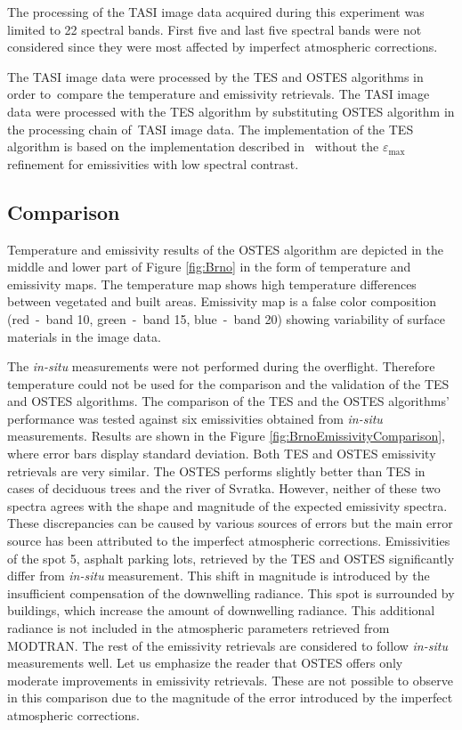 The processing of the TASI image data acquired during this experiment was limited to 22 spectral bands. First five and last five spectral bands were not considered since they were most affected by imperfect atmospheric corrections.

The TASI image data were processed by the TES and OSTES algorithms in order to~compare the temperature and emissivity retrievals. The TASI image data were processed with the TES algorithm by substituting OSTES algorithm in the processing chain of~TASI image data. The implementation of the TES algorithm is based on the implementation described in~\cite{JS12} without the $\varepsilon_\mathrm{max}$ refinement for emissivities with low spectral contrast.
 
\subsection*{Comparison}

Temperature and emissivity results of the OSTES algorithm are depicted in the middle and lower part of Figure \ref{fig:Brno} in the form of temperature and emissivity maps. The temperature map shows high temperature differences between vegetated and built areas. Emissivity map is a false color composition (red~-~band 10, green~-~band 15, blue~-~band 20) showing variability of surface materials in the image data.

\newpage
The \textit{in-situ} measurements were not performed during the overflight. Therefore temperature could not be used for the comparison and the validation of the TES and OSTES algorithms. The comparison of the TES and the OSTES algorithms' performance was tested against six emissivities obtained from \textit{in-situ} measurements. Results are shown in the Figure \ref{fig:BrnoEmissivityComparison}, where error bars display standard deviation. Both TES and OSTES emissivity retrievals are very similar. The OSTES performs slightly better than TES in cases of deciduous trees and the river of Svratka. However, neither of these two spectra agrees with the shape and magnitude of the expected emissivity spectra. These discrepancies can be caused by various sources of errors but the main error source has been attributed to the imperfect atmospheric corrections. Emissivities of the spot 5, asphalt parking lots, retrieved by the TES and OSTES significantly differ from \textit{in-situ} measurement. This shift in magnitude is introduced by the insufficient compensation of the downwelling radiance. This spot is surrounded by buildings, which increase the amount of downwelling radiance. This additional radiance is not included in the atmospheric parameters retrieved from MODTRAN. The rest of the emissivity retrievals are considered to follow \textit{in-situ} measurements well. Let us emphasize the reader that OSTES offers only moderate improvements in emissivity retrievals. These are not possible to observe in this comparison due to the magnitude of the error introduced by the imperfect atmospheric corrections. 

